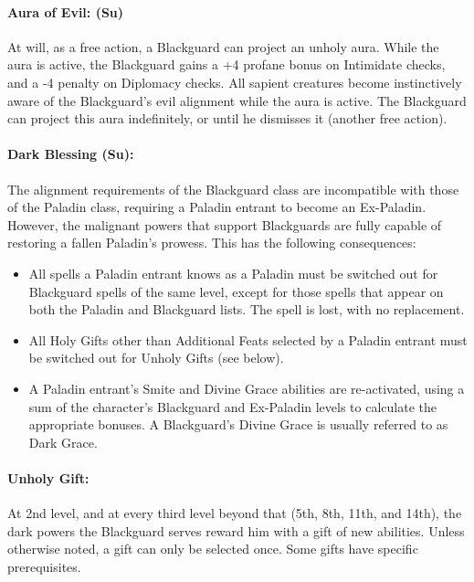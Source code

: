\paragraph[Aura of Evil]{Aura of Evil: (Su)}
\label{sec:AuroOfEvil} 
At will, as a free action, a Blackguard can project an unholy aura.
While the aura is active, the Blackguard gains a +4 profane bonus on Intimidate checks, and a -4 penalty on Diplomacy checks.
All sapient creatures become instinctively aware of the Blackguard's evil alignment while the aura is active.
The Blackguard can project this aura indefinitely, or until he dismisses it (another free action). 

\paragraph[Dark Blessing]{Dark Blessing (Su):} 
\label{sec:DarkBlessing}
The alignment requirements of the Blackguard class are incompatible with those of the Paladin class, requiring a Paladin entrant to become an Ex-Paladin. However, the malignant powers that support Blackguards are fully capable of restoring a fallen Paladin's prowess. This has the following consequences:
\begin{itemize}
 \item All spells a Paladin entrant knows as a Paladin must be switched out for Blackguard spells of the same level, except for those spells that appear on both the Paladin and Blackguard lists. The  spell is lost, with no replacement.
 \item All Holy Gifts other than Additional Feats selected by a Paladin entrant must be switched out for Unholy Gifts (see below).
 \item A Paladin entrant's Smite and Divine Grace abilities are re-activated, using a sum of the character's Blackguard and Ex-Paladin levels to calculate the appropriate bonuses. A Blackguard's Divine Grace is usually referred to as Dark Grace.
\end{itemize}

\paragraph[Unholy Gift]{Unholy Gift:}
\label{sec:UnholyGift}
At 2nd level, and at every third level beyond that (5th, 8th, 11th, and 14th), the dark powers the Blackguard serves reward him with a gift of new abilities. Unless otherwise noted, a gift can only be selected once. Some gifts have specific prerequisites.

